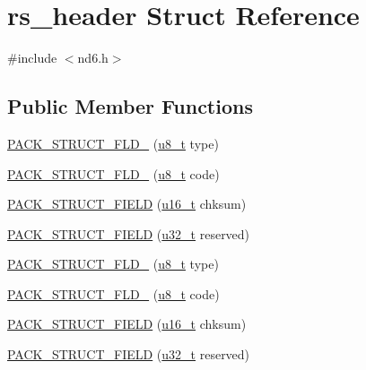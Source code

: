 \hypertarget{structrs__header}{}\section{rs\+\_\+header Struct Reference}
\label{structrs__header}


{\ttfamily \#include $<$nd6.\+h$>$}

\subsection*{Public Member Functions}
\begin{DoxyCompactItemize}
\item 
\hyperlink{structrs__header_a54291223dd1e7501f4e252399eac6d4a}{P\+A\+C\+K\+\_\+\+S\+T\+R\+U\+C\+T\+\_\+\+F\+L\+D\+\_} (\hyperlink{group__compiler__abstraction_ga4caecabca98b43919dd11be1c0d4cd8e}{u8\+\_\+t} type)
\item 
\hyperlink{structrs__header_af17d7ef3813c8b32b7d4ba2bdb953e74}{P\+A\+C\+K\+\_\+\+S\+T\+R\+U\+C\+T\+\_\+\+F\+L\+D\+\_} (\hyperlink{group__compiler__abstraction_ga4caecabca98b43919dd11be1c0d4cd8e}{u8\+\_\+t} code)
\item 
\hyperlink{structrs__header_a90e37b6c47a027b0a312d093180498ea}{P\+A\+C\+K\+\_\+\+S\+T\+R\+U\+C\+T\+\_\+\+F\+I\+E\+LD} (\hyperlink{group__compiler__abstraction_ga77570ac4fcab86864fa1916e55676da2}{u16\+\_\+t} chksum)
\item 
\hyperlink{structrs__header_a215d60e7c8f0c9906d437f394ab4b66c}{P\+A\+C\+K\+\_\+\+S\+T\+R\+U\+C\+T\+\_\+\+F\+I\+E\+LD} (\hyperlink{group__compiler__abstraction_ga4c14294869aceba3ef9d4c0c302d0f33}{u32\+\_\+t} reserved)
\item 
\hyperlink{structrs__header_a54291223dd1e7501f4e252399eac6d4a}{P\+A\+C\+K\+\_\+\+S\+T\+R\+U\+C\+T\+\_\+\+F\+L\+D\+\_} (\hyperlink{group__compiler__abstraction_ga4caecabca98b43919dd11be1c0d4cd8e}{u8\+\_\+t} type)
\item 
\hyperlink{structrs__header_af17d7ef3813c8b32b7d4ba2bdb953e74}{P\+A\+C\+K\+\_\+\+S\+T\+R\+U\+C\+T\+\_\+\+F\+L\+D\+\_} (\hyperlink{group__compiler__abstraction_ga4caecabca98b43919dd11be1c0d4cd8e}{u8\+\_\+t} code)
\item 
\hyperlink{structrs__header_a90e37b6c47a027b0a312d093180498ea}{P\+A\+C\+K\+\_\+\+S\+T\+R\+U\+C\+T\+\_\+\+F\+I\+E\+LD} (\hyperlink{group__compiler__abstraction_ga77570ac4fcab86864fa1916e55676da2}{u16\+\_\+t} chksum)
\item 
\hyperlink{structrs__header_a215d60e7c8f0c9906d437f394ab4b66c}{P\+A\+C\+K\+\_\+\+S\+T\+R\+U\+C\+T\+\_\+\+F\+I\+E\+LD} (\hyperlink{group__compiler__abstraction_ga4c14294869aceba3ef9d4c0c302d0f33}{u32\+\_\+t} reserved)
\end{DoxyCompactItemize}


